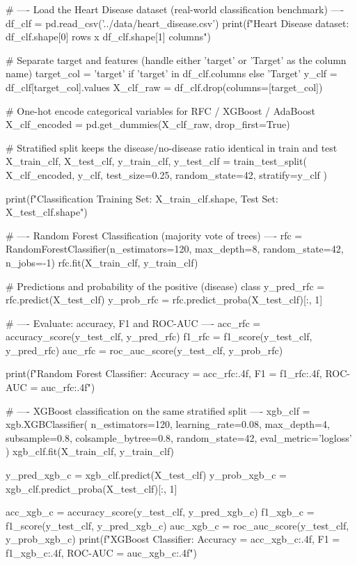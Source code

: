 \begin{codebox}[title={Load the Heart Disease dataset (real-world classification benchmark)}]
# ---- Load the Heart Disease dataset (real-world classification benchmark) ----
df_clf = pd.read_csv('../data/heart_disease.csv')
print(f"Heart Disease dataset: {df_clf.shape[0]} rows x {df_clf.shape[1]} columns")

# Separate target and features (handle either 'target' or 'Target' as the column name)
target_col = 'target' if 'target' in df_clf.columns else 'Target'
y_clf = df_clf[target_col].values
X_clf_raw = df_clf.drop(columns=[target_col])

# One-hot encode categorical variables for RFC / XGBoost / AdaBoost
X_clf_encoded = pd.get_dummies(X_clf_raw, drop_first=True)

# Stratified split keeps the disease/no-disease ratio identical in train and test
X_train_clf, X_test_clf, y_train_clf, y_test_clf = train_test_split(
    X_clf_encoded, y_clf, test_size=0.25, random_state=42, stratify=y_clf
)

print(f"Classification Training Set: {X_train_clf.shape}, Test Set: {X_test_clf.shape}")

# ---- Random Forest Classification (majority vote of trees) ----
rfc = RandomForestClassifier(n_estimators=120, max_depth=8, random_state=42, n_jobs=-1)
rfc.fit(X_train_clf, y_train_clf)

# Predictions and probability of the positive (disease) class
y_pred_rfc = rfc.predict(X_test_clf)
y_prob_rfc = rfc.predict_proba(X_test_clf)[:, 1]

# ---- Evaluate: accuracy, F1 and ROC-AUC ----
acc_rfc = accuracy_score(y_test_clf, y_pred_rfc)
f1_rfc = f1_score(y_test_clf, y_pred_rfc)
auc_rfc = roc_auc_score(y_test_clf, y_prob_rfc)

print(f"Random Forest Classifier: Accuracy = {acc_rfc:.4f}, F1 = {f1_rfc:.4f}, ROC-AUC = {auc_rfc:.4f}")
\end{codebox}

\begin{codebox}[title={XGBoost classification on the same stratified split}]
# ---- XGBoost classification on the same stratified split ----
xgb_clf = xgb.XGBClassifier(
    n_estimators=120, learning_rate=0.08, max_depth=4,
    subsample=0.8, colsample_bytree=0.8,
    random_state=42, eval_metric='logloss'
)
xgb_clf.fit(X_train_clf, y_train_clf)

y_pred_xgb_c = xgb_clf.predict(X_test_clf)
y_prob_xgb_c = xgb_clf.predict_proba(X_test_clf)[:, 1]

acc_xgb_c = accuracy_score(y_test_clf, y_pred_xgb_c)
f1_xgb_c = f1_score(y_test_clf, y_pred_xgb_c)
auc_xgb_c = roc_auc_score(y_test_clf, y_prob_xgb_c)
print(f"XGBoost Classifier:   Accuracy = {acc_xgb_c:.4f}, F1 = {f1_xgb_c:.4f}, ROC-AUC = {auc_xgb_c:.4f}")
\end{codebox}
